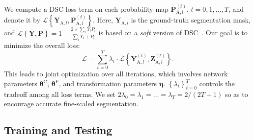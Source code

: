 \documentclass[10pt,twocolumn,letterpaper]{article}
\begin{document}
We compute a DSC loss term on each probability map $\mathbf{P}_{\mathrm{A},l}^{\left(t\right)}$, ${t}={0,1,\ldots,T}$,
and denote it by $\mathcal{L}\!\left\{\mathbf{Y}_{\mathrm{A},l},\mathbf{P}_{\mathrm{A},l}^{\left(t\right)}\right\}$.
Here, $\mathbf{Y}_{\mathrm{A},l}$ is the ground-truth segmentation mask,
and ${\mathcal{L}\!\left\{\mathbf{Y},\mathbf{P}\right\}}={1-\frac{2\times{\sum_i}Y_iP_i}{{\sum_i}Y_i+P_i}}$
is based on a {\em soft} version of DSC~\cite{Milletari_2016_VNet}.
Our goal is to minimize the overall loss:
\begin{equation}
\label{Eqn:LossFunction}
{\mathcal{L}}={{\sum_{t=0}^T}\lambda_t\cdot
    \mathcal{L}\!\left\{\mathbf{Y}_{\mathrm{A},l}^{\left(t\right)},\mathbf{Z}_{\mathrm{A},l}^{\left(t\right)}\right\}}.
\end{equation}
This leads to joint optimization over all iterations, which involves network parameters $\boldsymbol{\theta}^\mathrm{C}$,
$\boldsymbol{\theta}^\mathrm{F}$, and transformation parameters $\boldsymbol{\eta}$.
$\left\{\lambda_t\right\}_{t=0}^T$ controls the tradeoff among all loss terms.
We set ${2\lambda_0}={\lambda_1}=\ldots={\lambda_T}={2/\left(2T+1\right)}$ so as to encourage accurate fine-scaled segmentation.


\subsection{Training and Testing}
\label{Approach:TrainingAndTesting}
\end{document}
